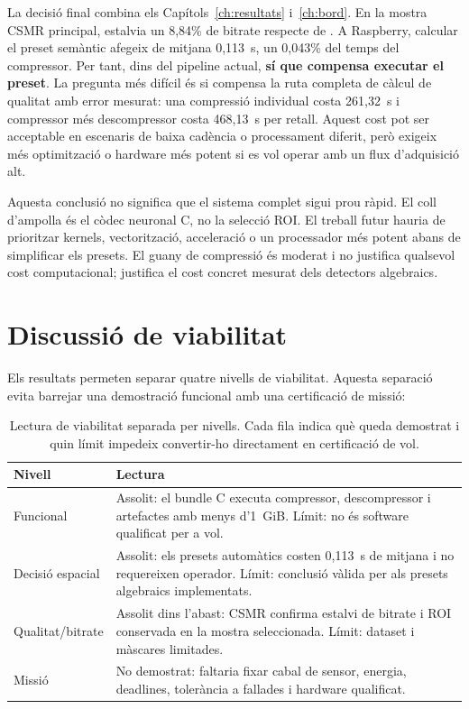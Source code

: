 La decisió final combina els Capítols~\ref{ch:resultats} i~\ref{ch:bord}. En la
mostra CSMR principal,  estalvia un 8,84\% de bitrate
respecte de . A Raspberry, calcular el preset semàntic afegeix de
mitjana 0,113~s, un 0,043\% del temps del compressor. Per tant, dins del
pipeline actual, \textbf{sí que compensa executar el preset}. La pregunta més
difícil és si compensa la ruta completa de càlcul de qualitat amb error mesurat:
una compressió individual costa 261,32~s i compressor més descompressor costa
468,13~s per retall. Aquest cost pot ser acceptable en escenaris de baixa
cadència o processament diferit, però exigeix més optimització o hardware més
potent si es vol operar amb un flux d'adquisició alt.

Aquesta conclusió no significa que el sistema complet sigui prou ràpid. El
coll d'ampolla és el còdec neuronal C, no la selecció ROI. El treball futur
hauria de prioritzar kernels, vectorització, acceleració o un processador més
potent abans de simplificar els presets. El guany de compressió és moderat i
no justifica qualsevol cost computacional; justifica el cost concret mesurat
dels detectors algebraics.

\section{Discussió de viabilitat}\label{sec:onboard_discussion}

Els resultats permeten separar quatre nivells de viabilitat. Aquesta separació
evita barrejar una demostració funcional amb una certificació de missió:

\begin{table}[H]
\centering
\footnotesize
\begin{tabularx}{\textwidth}{>{\raggedright\arraybackslash}p{}>{\raggedright\arraybackslash}X}
\toprule
Nivell & Lectura \\
\midrule
Funcional &
Assolit: el bundle C executa compressor, descompressor i artefactes amb menys
d'1~GiB. Límit: no és software qualificat per a vol. \\
Decisió espacial &
Assolit: els presets automàtics costen 0,113~s de mitjana i no requereixen
operador. Límit: conclusió vàlida per als presets algebraics implementats. \\
Qualitat/bitrate &
Assolit dins l'abast: CSMR confirma estalvi de bitrate i ROI conservada en la
mostra seleccionada. Límit: dataset i màscares limitades. \\
Missió &
No demostrat: faltaria fixar cabal de sensor, energia, deadlines, tolerància a
fallades i hardware qualificat. \\
\bottomrule
\end{tabularx}
\caption{Lectura de viabilitat separada per nivells. Cada fila indica què queda
demostrat i quin límit impedeix convertir-ho directament en certificació de
vol.}
\label{tab:onboard_viability_levels}
\end{table}


